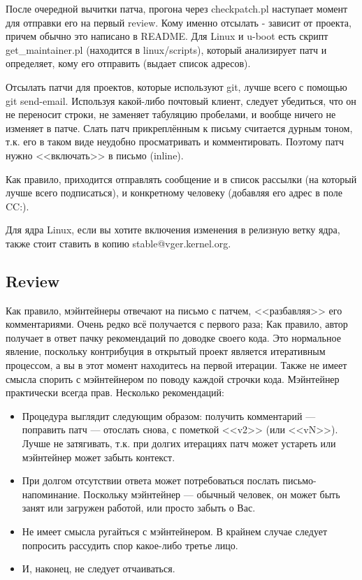 \documentclass[10pt, a5paper]{article}
\begin{document}
После очередной вычитки патча, прогона через checkpatch.pl наступает момент для отправки его на первый review. Кому именно отсылать - зависит от проекта, причем обычно это написано в README. Для Linux и u-boot есть скрипт get\_maintainer.pl (находится в linux/scripts), который анализирует патч и определяет, кому его отправить (выдает список адресов).

Отсылать патчи для проектов, которые используют git, лучше всего с помощью git send-email. Используя какой-либо почтовый клиент, следует убедиться, что он не переносит строки, не заменяет табуляцию пробелами, и вообще ничего не изменяет в патче. Слать патч прикреплённым к письму считается дурным тоном, т.к. его в таком виде неудобно просматривать и комментировать. Поэтому патч нужно <<включать>> в письмо (inline).

Как правило, приходится отправлять сообщение и в список рассылки (на который лучше всего подписаться), и конкретному человеку (добавляя его адрес в поле CC:).

Для ядра Linux, если вы хотите включения изменения в релизную ветку ядра, также стоит ставить в копию stable@vger.kernel.org.

\subsection*{Review}

Как правило, мэйнтейнеры отвечают на письмо с патчем, <<разбавляя>> его комментариями. Очень редко всё получается с первого раза; Как правило, автор получает в ответ пачку рекомендаций по доводке своего кода. Это нормальное явление, поскольку контрибуция в открытый проект является итеративным процессом, а вы в этот момент находитесь на первой итерации. Также не имеет смысла спорить с мэйнтейнером по поводу каждой строчки кода. Мэйнтейнер практически всегда прав. Несколько рекомендаций:

\begin{itemize}
    \item Процедура выглядит следующим образом: получить комментарий --- поправить патч --- отослать снова, с пометкой <<v2>> (или <<vN>>). Лучше не затягивать, т.к. при долгих итерациях патч может устареть или мэйнтейнер может забыть контекст.
    \item При долгом отсутствии ответа может потребоваться послать письмо-напоминание. Поскольку мэйнтейнер --- обычный человек, он может быть занят или загружен работой, или просто забыть о Вас.
    \item Не имеет смысла ругайться с мэйнтейнером. В крайнем случае следует попросить рассудить спор какое-либо третье лицо.
    \item И, наконец, не следует отчаиваться.
\end{itemize}
\end{document}
